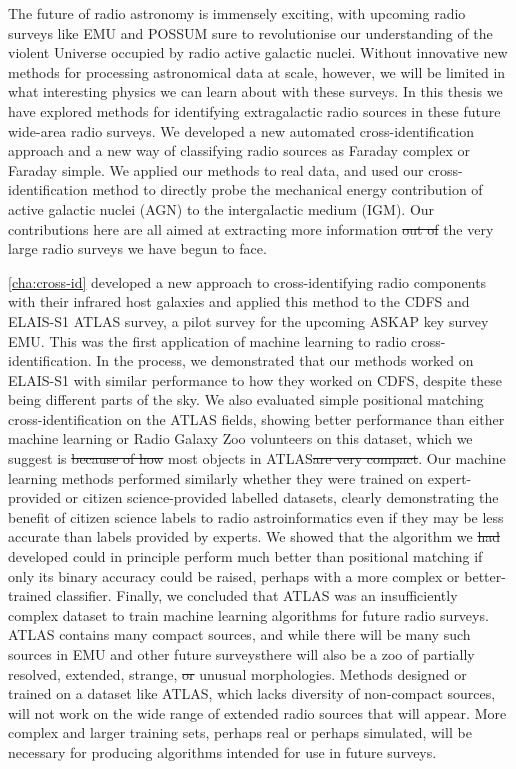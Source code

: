 \documentclass[11pt, a4paper]{book}
\providecommand{\DIFaddtex}[1]{{\protect\color{blue}\uwave{#1}}} %
\providecommand{\DIFdeltex}[1]{{\protect\color{red}\sout{#1}}}                      %
\providecommand{\DIFaddbegin}{} %
\providecommand{\DIFaddend}{} %
\providecommand{\DIFdelbegin}{} %
\providecommand{\DIFdelend}{} %
\providecommand{\DIFadd}[1]{\texorpdfstring{\DIFaddtex{#1}}{#1}} %
\providecommand{\DIFdel}[1]{\texorpdfstring{\DIFdeltex{#1}}{}} %
\newcommand{\DIFscaledelfig}{0.5}
\newlength{\DIFdelgraphicswidth} %
\newlength{\DIFdelgraphicsheight} %
\newcommand{\DIFaddincludegraphics}[2][]{{\color{blue}\fbox{\DIFOincludegraphics[#1]{#2}}}} %
\newcommand{\DIFdelincludegraphics}[2][]{%
\sbox{\DIFdelgraphicsbox}{\DIFOincludegraphics[#1]{#2}}%
\settoboxwidth{\DIFdelgraphicswidth}{\DIFdelgraphicsbox} %
\settoboxtotalheight{\DIFdelgraphicsheight}{\DIFdelgraphicsbox} %
\scalebox{\DIFscaledelfig}{%
\parbox[b]{\DIFdelgraphicswidth}{\usebox{\DIFdelgraphicsbox}\\[-\baselineskip] \rule{\DIFdelgraphicswidth}{0em}}\llap{\resizebox{\DIFdelgraphicswidth}{\DIFdelgraphicsheight}{%
\setlength{\unitlength}{\DIFdelgraphicswidth}%
\begin{picture}(1,1)%
\thicklines\linethickness{2pt} %
{\color[rgb]{1,0,0}\put(0,0){\framebox(1,1){}}}%
{\color[rgb]{1,0,0}\put(0,0){\line( 1,1){1}}}%
{\color[rgb]{1,0,0}\put(0,1){\line(1,-1){1}}}%
\end{picture}%
}\hspace*{3pt}}} %
} %
\DeclareRobustCommand{\DIFaddbegin}{\DIFOaddbegin \let\includegraphics\DIFaddincludegraphics} %
\DeclareRobustCommand{\DIFaddend}{\DIFOaddend \let\includegraphics\DIFOincludegraphics} %
\DeclareRobustCommand{\DIFdelbegin}{\DIFOdelbegin \let\includegraphics\DIFdelincludegraphics} %
\DeclareRobustCommand{\DIFdelend}{\DIFOaddend \let\includegraphics\DIFOincludegraphics} %
\begin{document}
The future of radio astronomy is immensely exciting, with upcoming radio surveys like EMU and POSSUM sure to revolutionise our understanding of the violent Universe occupied by radio active galactic nuclei. Without innovative new methods for processing astronomical data at scale, however, we will be limited in what interesting physics we can learn about with these surveys. In this thesis we have explored methods for identifying extragalactic radio sources in these future wide-area radio surveys. We developed a new automated cross-identification approach and a new way of classifying radio sources as Faraday complex or Faraday simple. We applied our methods to real data, and used our cross-identification method to directly probe the mechanical energy contribution of active galactic nuclei (AGN) to the intergalactic medium (IGM). Our contributions here are all aimed at extracting more information \DIFdelbegin \DIFdel{out of }\DIFdelend \DIFaddbegin \DIFadd{from }\DIFaddend the very large radio surveys \DIFaddbegin \DIFadd{that }\DIFaddend we have begun to face.

\autoref{cha:cross-id} developed a new approach to cross-identifying radio components with their infrared host galaxies and applied this method to the CDFS and ELAIS-S1 ATLAS survey, a pilot survey for the upcoming ASKAP key survey EMU. This was the first application of machine learning to radio cross-identification. In the process, we demonstrated that our methods worked on ELAIS-S1 with similar performance to how they worked on CDFS, despite these being different parts of the sky. We also evaluated simple positional matching cross-identification on the ATLAS fields, showing better performance than either machine learning or Radio Galaxy Zoo volunteers on this dataset, which we suggest is \DIFdelbegin \DIFdel{because of how }\DIFdelend \DIFaddbegin \DIFadd{due to the compact nature of }\DIFaddend most objects in ATLAS\DIFdelbegin \DIFdel{are very compact}\DIFdelend . Our machine learning methods performed similarly whether they were trained on expert-provided or citizen science-provided labelled datasets, clearly demonstrating the benefit of citizen science labels to radio astroinformatics even if they may be less accurate than labels provided by experts. We showed that the algorithm we \DIFdelbegin \DIFdel{had }\DIFdelend developed could in principle perform much better than positional matching if only its binary accuracy could be raised, perhaps with a more complex or better-trained classifier. Finally, we concluded that ATLAS was an insufficiently complex dataset to train machine learning algorithms for future radio surveys. ATLAS contains many compact sources, and while there will be many such sources in EMU and other future surveys\DIFaddbegin \DIFadd{, }\DIFaddend there will also be a zoo of partially resolved, extended, strange, \DIFdelbegin \DIFdel{or }\DIFdelend \DIFaddbegin \DIFadd{and }\DIFaddend unusual morphologies. Methods designed or trained on a dataset like ATLAS, which lacks diversity of non-compact sources, will not work on the wide range of extended radio sources that will appear. More complex and larger training sets, perhaps real or perhaps simulated, will be necessary for producing algorithms intended for use in future surveys.
\end{document}
